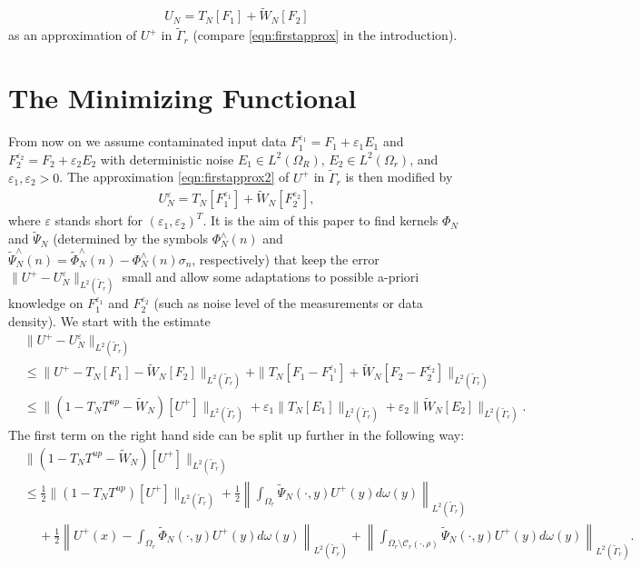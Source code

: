 \documentclass[a4paper, 10pt]{article}
\numberwithin{equation}{section}
\theoremstyle{definition}
\newcommand{\eps}{\ensuremath{\varepsilon}}
\begin{document}
\begin{align}\label{eqn:firstapprox2}
{U_N={T}_N[F_1]+{\tilde{W}}_N[F_2]}
\end{align}
as an approximation of $U^+$ in $\tilde{\Gamma}_r$ (compare \eqref{eqn:firstapprox} in the introduction).


\section{The Minimizing Functional}\label{sec:min}%

From now on we assume contaminated input data $F_1^{\eps_1}=F_1+\eps_1E_1$ and $F_2^{\varepsilon_2}=F_2+\varepsilon_2E_2$ with deterministic noise $E_1\in L^2(\Omega_R)$, $E_2\in L^2(\Omega_r)$, and $\eps_1,\eps_2>0$. The approximation \eqref{eqn:firstapprox2} of $U^+$ in $\tilde{\Gamma}_r$ is then modified by
\begin{align}\label{eqn:firstapprox3}
{U_N^\eps={T}_N[F_1^{\eps_1}]+{\tilde{W}}_N[F_2^{\eps_2}],}
\end{align}
where $\eps$ stands short for $(\eps_1,\eps_2)^T$. It is the aim of this paper to find kernels $\Phi_N$ and $\tilde{\Psi}_N$ (determined by the symbols $\Phi_N^\wedge(n)$ and $\tilde{\Psi}_N^\wedge(n)=\tilde{\Phi}_N^\wedge(n)-\Phi_N^\wedge(n)\sigma_n$, respectively) that keep the error $\|U^+-U_N^\eps\|_{L^2(\tilde{\Gamma}_r)}$ small and allow some adaptations to possible a-priori knowledge on $F_1^{\eps_1}$ and $F_2^{\eps_2}$ (such as noise level of the measurements or data density). We start with the estimate
\begin{align}
&\|U^+ - U_N^{\varepsilon}\|_{L^2(\tilde{\Gamma}_r)}\label{eqn:errorest2}
\\&\leq \|U^+ - {T}_{N}[F_1]-\tilde{W}_{N}[F_2]\|_{L^2(\tilde{\Gamma}_r)}+\|{T}_{N}[F_1-F_1^{\varepsilon_1}]+\tilde{W}_{N}[F_2-F_2^{\varepsilon_2}]\|_{L^2(\tilde{\Gamma}_r)}\nonumber
\\&\leq \|(1-{T}_{N}{T}^{up}-\tilde{W}_{N})[U^+]\|_{L^2(\tilde{\Gamma}_r)}+\varepsilon_1\|{T}_{N}[E_1]\|_{L^2(\tilde{\Gamma}_r)}+\varepsilon_2\|\tilde{W}_{N}[E_2]\|_{L^2(\tilde{\Gamma}_r)}.\nonumber
\end{align}
The first term on the right hand side can be split up further in the following way:
\begin{align}
& \|(1-{T}_{N}{T}^{up}-\tilde{W}_{N})[U^+]\|_{L^2(\tilde{\Gamma}_r)}\label{eqn:errorest22}
\\&\leq \frac{1}{2}\|(1-{T}_{N}{T}^{up})[U^+]\|_{L^2(\tilde{\Gamma}_r)}+ \frac{1}{2}\left\|\int_{\Omega_r}\tilde{\Psi}_N(\cdot,y)U^+(y)d\omega(y)\right\|_{L^2(\tilde{\Gamma}_r)}\nonumber
\\&\quad\, +\frac{1}{2}\left\|U^+(x)-\int_{\Omega_r}\tilde{\Phi}_N(\cdot,y)U^+(y)d\omega(y)\right\|_{L^2(\tilde{\Gamma}_r)}+ \left\|\int_{\Omega_r\setminus\mathcal{C}_r(\cdot,\rho)}\tilde{\Psi}_N(\cdot,y)U^+(y)d\omega(y)\right\|_{L^2(\tilde{\Gamma}_r)}.\nonumber
\end{align}
\end{document}
